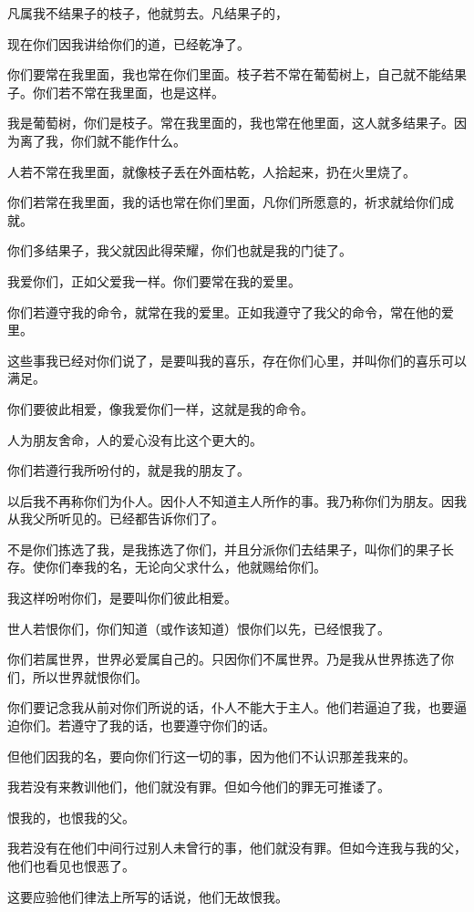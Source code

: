 \documentclass[12pt,oneside]{book}
\begin{document}
凡属我不结果子的枝子，他就剪去。凡结果子的，

现在你们因我讲给你们的道，已经乾净了。

你们要常在我里面，我也常在你们里面。枝子若不常在葡萄树上，自己就不能结果子。你们若不常在我里面，也是这样。

我是葡萄树，你们是枝子。常在我里面的，我也常在他里面，这人就多结果子。因为离了我，你们就不能作什么。

人若不常在我里面，就像枝子丢在外面枯乾，人拾起来，扔在火里烧了。

你们若常在我里面，我的话也常在你们里面，凡你们所愿意的，祈求就给你们成就。

你们多结果子，我父就因此得荣耀，你们也就是我的门徒了。

我爱你们，正如父爱我一样。你们要常在我的爱里。

你们若遵守我的命令，就常在我的爱里。正如我遵守了我父的命令，常在他的爱里。

这些事我已经对你们说了，是要叫我的喜乐，存在你们心里，并叫你们的喜乐可以满足。

你们要彼此相爱，像我爱你们一样，这就是我的命令。

人为朋友舍命，人的爱心没有比这个更大的。

你们若遵行我所吩付的，就是我的朋友了。

以后我不再称你们为仆人。因仆人不知道主人所作的事。我乃称你们为朋友。因我从我父所听见的。已经都告诉你们了。

不是你们拣选了我，是我拣选了你们，并且分派你们去结果子，叫你们的果子长存。使你们奉我的名，无论向父求什么，他就赐给你们。

我这样吩咐你们，是要叫你们彼此相爱。

世人若恨你们，你们知道（或作该知道）恨你们以先，已经恨我了。

你们若属世界，世界必爱属自己的。只因你们不属世界。乃是我从世界拣选了你们，所以世界就恨你们。

你们要记念我从前对你们所说的话，仆人不能大于主人。他们若逼迫了我，也要逼迫你们。若遵守了我的话，也要遵守你们的话。

但他们因我的名，要向你们行这一切的事，因为他们不认识那差我来的。

我若没有来教训他们，他们就没有罪。但如今他们的罪无可推诿了。

恨我的，也恨我的父。

我若没有在他们中间行过别人未曾行的事，他们就没有罪。但如今连我与我的父，他们也看见也恨恶了。

这要应验他们律法上所写的话说，他们无故恨我。
\end{document}
